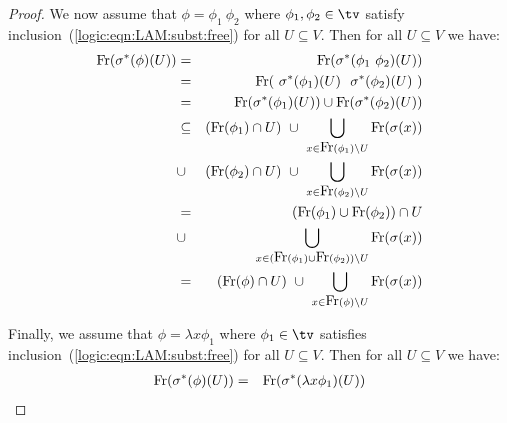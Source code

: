 \begin{proof}
We now assume that $\phi=\phi_{1}\ \phi_{2}$ where $\phi_{1}, \phi_{2}\in\tv$ satisfy 
inclusion~(\ref{logic:eqn:LAM:subst:free}) for all $U\subseteq V$. Then for all
$U\subseteq V$ we have:
    \begin{eqnarray*}
        \free(\sigma^{*}(\phi)(U))
        &=&\free(\sigma^{*}(\phi_{1}\ \phi_{2})(U))\\
        &=&\free(\ \sigma^{*}(\phi_{1})(U)\ \ \sigma^{*}(\phi_{2})(U)\ )\\
        &=&\free(\sigma^{*}(\phi_{1})(U))\cup\free(\sigma^{*}(\phi_{2})(U))\\
        &\subseteq&(\free(\phi_{1})\cap U)\ \cup\ 
            \bigcup_{x\in\free(\phi_{1})\setminus U} \free(\sigma(x))\\
        &\cup&(\free(\phi_{2})\cap U)\ \cup\ 
            \bigcup_{x\in\free(\phi_{2})\setminus U} \free(\sigma(x))\\
        &=&(\free(\phi_{1})\cup\free(\phi_{2}))\cap U\\
        &\cup&\bigcup_{x\in(\free(\phi_{1})\cup\free(\phi_{2}))\setminus U}
            \free(\sigma(x))\\
        &=&(\free(\phi)\cap U)\ \cup\ \bigcup_{x\in\free(\phi)\setminus U}
            \free(\sigma(x))
    \end{eqnarray*}

Finally, we assume that $\phi=\lambda x\phi_{1}$ where $\phi_{1}\in\tv$ satisfies
inclusion~(\ref{logic:eqn:LAM:subst:free}) for all $U\subseteq V$. Then for all
$U\subseteq V$ we have:
    \begin{eqnarray*}
        \mbox{\rm Fr}(\sigma^{*}(\phi)(U))
        &=&\mbox{\rm Fr}(\sigma^{*}(\lambda x\phi_{1})(U))
    \end{eqnarray*}
\end{proof}




